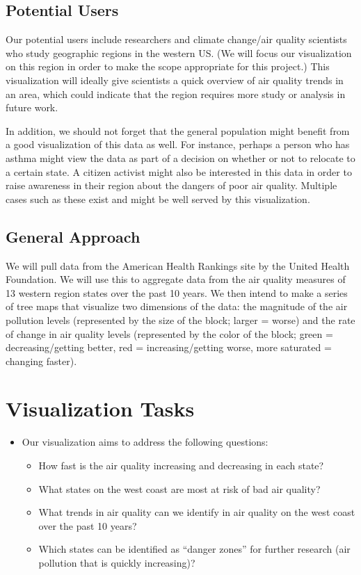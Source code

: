 \documentclass[journal]{vgtc}                %
\begin{document}
\subsection{Potential Users}
Our potential users include researchers and climate change/air quality scientists who study geographic regions in the 
western US. (We will focus our visualization on this region in order to make the scope appropriate for this project.) 
This visualization will ideally give scientists a quick overview of air quality trends in an area, which could 
indicate that the region requires more study or analysis in future work.


In addition, we should not forget that the general population might benefit from a good visualization of this data as 
well. For instance, perhaps a person who has asthma might view the data as part of a decision on whether or not to 
relocate to a certain state. A citizen activist might also be interested in this data in order to raise awareness in 
their region about the dangers of poor air quality. Multiple cases such as these exist and might be well served by 
this visualization.

\subsection{General Approach}
We will pull data from the American Health Rankings site by the United Health Foundation. We will use this to 
aggregate data from the air quality measures of 13 western region states over the past 10 years. We then intend to 
make a 
series of tree maps that visualize two dimensions of the data: the magnitude of the air pollution levels (represented 
by the size of the block; larger = worse) and the rate of change in air quality levels (represented by the color of 
the block; green = decreasing/getting better, red = increasing/getting worse, more saturated = changing faster).

\section{Visualization Tasks}

\begin{itemize}
\item Our visualization aims to address the following questions:
  \begin{itemize}
    \item How fast is the air quality increasing and decreasing in each state?
    \item What states on the west coast are most at risk of bad air quality?
    \item What trends in air quality can we identify in air quality on the west coast over the past 10 years?
    \item Which states can be identified as “danger zones” for further research (air pollution that is quickly increasing)?
  \end{itemize}
\end{itemize}
\end{document}
